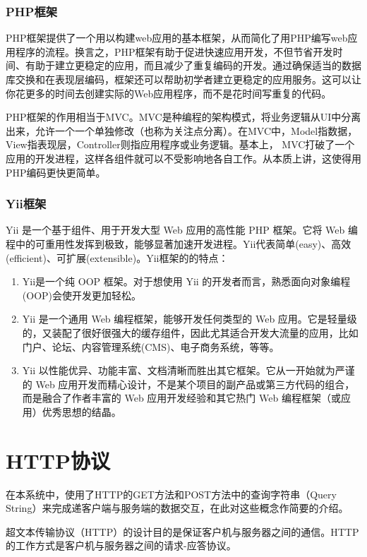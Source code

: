 \subsubsection{PHP框架}

PHP框架提供了一个用以构建web应用的基本框架，从而简化了用PHP编写web应用程序的流程。换言之，PHP框架有助于促进快速应用开发，不但节省开发时间、有助于建立更稳定的应用，而且减少了重复编码的开发。通过确保适当的数据库交换和在表现层编码，框架还可以帮助初学者建立更稳定的应用服务。这可以让你花更多的时间去创建实际的Web应用程序，而不是花时间写重复的代码。

PHP框架的作用相当于\gls{MVC}。MVC是种编程的架构模式，将业务逻辑从UI中分离出来，允许一个一个单独修改（也称为关注点分离）。在MVC中，Model指数据，View指表现层，Controller则指应用程序或业务逻辑。基本上， MVC打破了一个应用的开发进程，这样各组件就可以不受影响地各自工作。从本质上讲，这使得用PHP编码更快更简单。

\subsubsection{Yii框架}

Yii 是一个基于组件、用于开发大型 Web 应用的高性能 PHP 框架。它将 Web 编程中的可重用性发挥到极致，能够显著加速开发进程。Yii代表简单(easy)、高效(efficient)、可扩展(extensible)。Yii框架的的特点：

\begin{enumerate}
\item Yii是一个纯 OOP 框架。对于想使用 Yii 的开发者而言，熟悉面向对象编程(OOP)会使开发更加轻松。
\item Yii 是一个通用 Web 编程框架，能够开发任何类型的 Web 应用。它是轻量级的，又装配了很好很强大的缓存组件，因此尤其适合开发大流量的应用，比如门户、论坛、内容管理系统(CMS)、电子商务系统，等等。
\item Yii 以性能优异、功能丰富、文档清晰而胜出其它框架。它从一开始就为严谨的 Web 应用开发而精心设计，不是某个项目的副产品或第三方代码的组合，而是融合了作者丰富的 Web 应用开发经验和其它热门 Web 编程框架（或应用）优秀思想的结晶。
\end{enumerate}

\section{HTTP协议}
在本系统中，使用了\gls{HTTP}的GET方法和POST方法中的查询字符串（Query String）来完成递客户端与服务端的数据交互，在此对这些概念作简要的介绍。

超文本传输协议（HTTP）的设计目的是保证客户机与服务器之间的通信。HTTP 的工作方式是客户机与服务器之间的请求-应答协议\cite{fielding1999rfc}。

